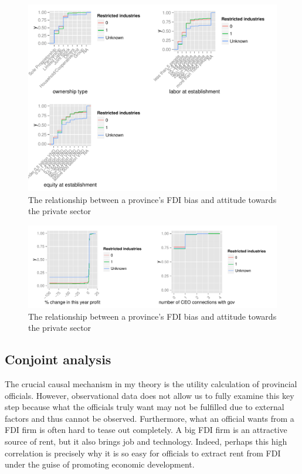 \begin{figure}[!ht]
\includegraphics[width=\textwidth, height=\textheight,keepaspectratio]{../figure/by_restrict_owner-labor-equity}
\caption{The relationship between a province's FDI bias and attitude towards the private sector}
\label{fig:by_restrict_owner}
\end{figure}

\begin{figure}[!ht]
\includegraphics[width=\textwidth, height=\textheight,keepaspectratio]{../figure/by_restrict_performance-connection}
\caption{The relationship between a province's FDI bias and attitude towards the private sector}
\label{fig:by_restrict_performance}
\end{figure}

\subsection{Conjoint analysis}

The crucial causal mechanism in my theory is the utility calculation of provincial officials. However, observational data does not allow us to fully examine this key step because what the officials truly want may not be fulfilled due to external factors and thus cannot be observed. Furthermore, what an official wants from a FDI firm is often hard to tease out completely. A big FDI firm is an attractive source of rent, but it also brings job and technology. Indeed, perhaps this high correlation is precisely why it is so easy for officials to extract rent from FDI under the guise of promoting economic development.

